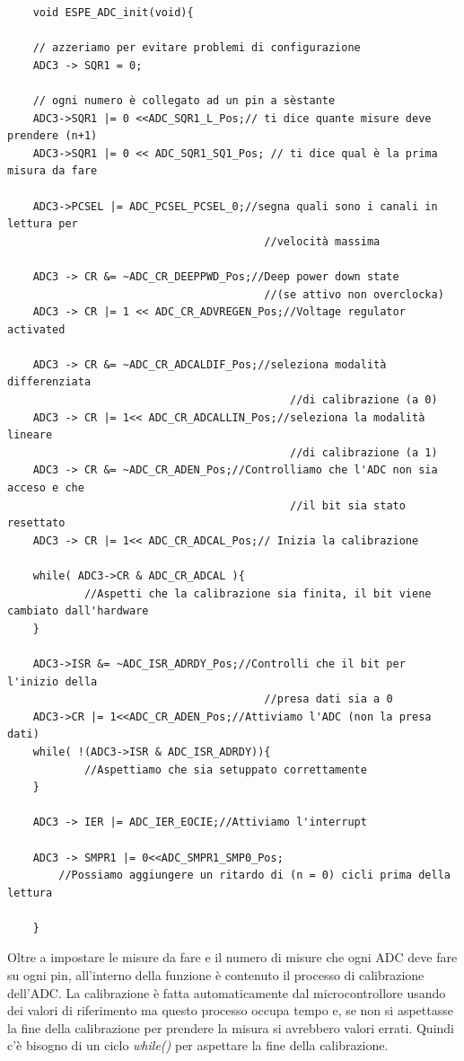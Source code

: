 \noindent
\begin{verbatim}
    void ESPE_ADC_init(void){

	// azzeriamo per evitare problemi di configurazione
	ADC3 -> SQR1 = 0;

	// ogni numero è collegato ad un pin a sèstante
	ADC3->SQR1 |= 0 <<ADC_SQR1_L_Pos;// ti dice quante misure deve prendere (n+1)
	ADC3->SQR1 |= 0 << ADC_SQR1_SQ1_Pos; // ti dice qual è la prima misura da fare

	ADC3->PCSEL |= ADC_PCSEL_PCSEL_0;//segna quali sono i canali in lettura per
                                        //velocità massima

	ADC3 -> CR &= ~ADC_CR_DEEPPWD_Pos;//Deep power down state
                                        //(se attivo non overclocka)
	ADC3 -> CR |= 1 << ADC_CR_ADVREGEN_Pos;//Voltage regulator activated

	ADC3 -> CR &= ~ADC_CR_ADCALDIF_Pos;//seleziona modalità differenziata
                                            //di calibrazione (a 0)
	ADC3 -> CR |= 1<< ADC_CR_ADCALLIN_Pos;//seleziona la modalità lineare
                                            //di calibrazione (a 1)
	ADC3 -> CR &= ~ADC_CR_ADEN_Pos;//Controlliamo che l'ADC non sia acceso e che
                                            //il bit sia stato resettato
	ADC3 -> CR |= 1<< ADC_CR_ADCAL_Pos;// Inizia la calibrazione

	while( ADC3->CR & ADC_CR_ADCAL ){							
            //Aspetti che la calibrazione sia finita, il bit viene cambiato dall'hardware
	}

	ADC3->ISR &= ~ADC_ISR_ADRDY_Pos;//Controlli che il bit per l'inizio della
                                        //presa dati sia a 0
	ADC3->CR |= 1<<ADC_CR_ADEN_Pos;//Attiviamo l'ADC (non la presa dati)
	while( !(ADC3->ISR & ADC_ISR_ADRDY)){						
            //Aspettiamo che sia setuppato correttamente
	}

	ADC3 -> IER |= ADC_IER_EOCIE;//Attiviamo l'interrupt

	ADC3 -> SMPR1 |= 0<<ADC_SMPR1_SMP0_Pos;
        //Possiamo aggiungere un ritardo di (n = 0) cicli prima della lettura

    }
\end{verbatim}
\label{code:ADC_init}

Oltre a impostare le misure da fare e il numero di misure che ogni ADC deve fare su ogni pin, all'interno della funzione è contenuto il processo di calibrazione dell'ADC. La calibrazione è fatta automaticamente dal microcontrollore usando dei valori di riferimento ma questo processo occupa tempo e, se non si aspettasse la fine della calibrazione per prendere la misura si avrebbero valori errati. Quindi c'è bisogno di un ciclo \textit{while()} per aspettare la fine della calibrazione.\\

